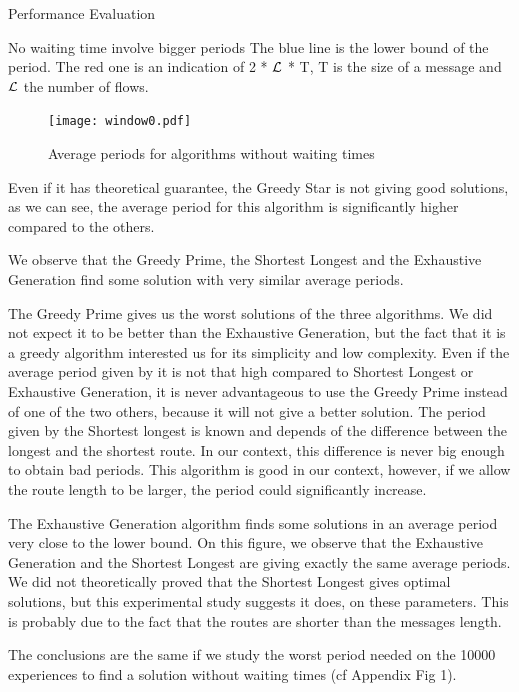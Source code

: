 \documentclass[a4paper,10pt]{report}
\begin{document}
\begin{chapter}{Performance Evaluation}
\begin{section}{No waiting time involve bigger periods}
The blue line is the lower bound of the period. The red one is an indication of 2 * ${\cal L}$ * T, T is the size of a message and ${\cal L}$ the number of flows.
\begin{figure}[H]
\hspace*{-3cm}
\centering
\texttt{[image: window0.pdf]}%
\caption{Average periods for algorithms without waiting times}
\end{figure}


Even if it has theoretical guarantee, the Greedy Star is not giving good solutions, as we can see, the average period for this algorithm is 
significantly higher compared to the others.

We observe that the Greedy Prime, the Shortest Longest and the Exhaustive Generation find some solution with very similar average periods.

The Greedy Prime gives us the worst solutions of the three algorithms. We did not expect it to be better than the Exhaustive Generation, but the fact that it is a greedy algorithm interested us for its simplicity and low complexity.
Even if the average period given by it is not that high compared to Shortest Longest or Exhaustive Generation, it is never advantageous to use the Greedy Prime instead of one of the two others, because it will not give a better solution.
The period given by the Shortest longest is known and depends of the difference between the longest and the shortest route.
In our context, this difference is never big enough to obtain bad periods. This algorithm is good in our context, however, if we allow the 
route length to be larger, the period could significantly increase.

The Exhaustive Generation algorithm finds some solutions in an average period very close to the lower bound.
On this figure, we observe that the Exhaustive Generation and the Shortest Longest are giving exactly the same average periods.
We did not theoretically proved that the Shortest Longest gives optimal solutions, but this experimental study suggests it does, on these parameters. This is probably due to the fact that the routes are shorter than the messages length.


The conclusions are the same if we study the worst period needed on the 10000 experiences to find a solution without waiting times (cf Appendix Fig 1).
\end{section}


\end{chapter}
\end{document}
